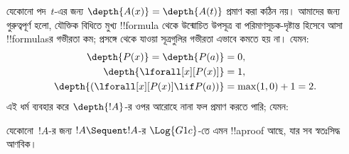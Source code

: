 \documentclass[../../../include/open-logic-section]{subfiles}
\begin{document}
যেকোনো পদ~$t$-এর জন্য
$\depth{A(x)} = \depth{A(t)}$
প্রমাণ করা কঠিন নয়। আমাদের
জন্য গুরুত্বপূর্ণ হলো, যৌক্তিক বিধিতে মুখ্য !!{formula} থেকে
উন্মোচিত উপসূত্র বা পরিমাণসূচক-দৃষ্টান্ত হিসেবে আসা !!{formula}sর
গভীরতা কম; প্রসঙ্গে থেকে যাওয়া সূত্রগুলির গভীরতা
এভাবে কমতে হয় না। যেমন:
\begin{align*}
\depth{P(x)} = \depth{P(a)} & = 0,\\
\depth{\lforall[x][P(x)]} & = 1,\\
\depth{(\lforall[x][P(x)] \lif P(a))} & = \max(1,0) + 1 = 2.
\end{align*}
এই ধর্ম ব্যবহার করে
$\depth{!A}$-র ওপর
আরোহে নানা ফল প্রমাণ
করতে পারি; যেমন:

\begin{prop}
যেকোনো~$!A$-র জন্য
$!A \Sequent !A$-র
$\Log{G1c}$-তে এমন !!a{proof}
আছে, যার সব স্বতঃসিদ্ধ আণবিক।
\end{prop}
\end{document}
